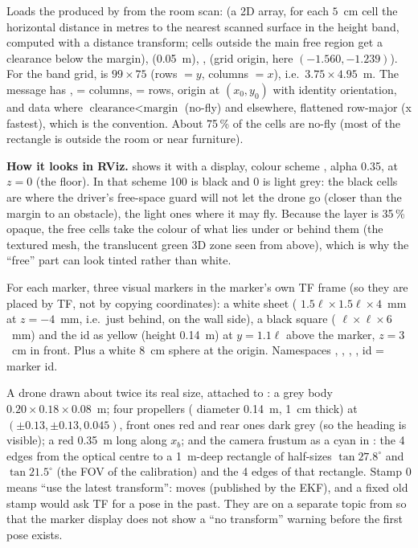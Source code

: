 Loads the  produced by  from the room scan:  (a 2D array, for
each $5$~cm cell the horizontal distance in metres to the nearest scanned surface in the height band, computed with a
distance transform; cells outside the main free region get a clearance below the margin),  (0.05~m),
,  (grid origin, here $(-1.560,-1.239)$). For the band grid,  is
$99\times75$ (rows $=y$, columns $=x$), i.e.\ $3.75\times4.95$~m. The message has
,  = columns,  = rows, origin at $(x_0,y_0)$ with identity
orientation, and data  where $\text{clearance}<\text{margin}$ (no-fly) and  elsewhere, flattened
row-major (x fastest), which is the  convention. About 75\,\% of the cells are no-fly (most of the
rectangle is outside the room or near furniture).

\textbf{How it looks in RViz.}  shows it with a  display, colour scheme , alpha
0.35, at $z=0$ (the floor). In that scheme 100 is black and 0 is light grey: the black cells are where the driver's
free-space guard will not let the drone go (closer than the margin to an obstacle), the light ones where it may fly.
Because the layer is 35\,\% opaque, the free cells take the colour of what lies under or behind them (the textured
mesh, the translucent green 3D zone seen from above), which is why the ``free'' part can look tinted rather than
white.

For each marker, three visual markers in the marker's own TF frame  (so they are placed by TF, not
by copying coordinates): a white sheet ( $1.5\ell\times1.5\ell\times4$~mm at $z=-4$~mm, i.e.\ just
behind, on the wall side), a black square ( $\ell\times\ell\times6$~mm) and the id as yellow
 (height 0.14~m) at $y=1.1\ell$ above the marker, $z=3$~cm in front. Plus a white 8~cm sphere
at the  origin. Namespaces , , , , id = marker id.

A drone drawn about twice its real size, attached to : a grey body 
$0.20\times0.18\times0.08$~m; four propellers ( diameter 0.14~m, 1~cm thick) at
$(\pm0.13,\pm0.13,0.045)$, front ones red and rear ones dark grey (so the heading is visible); a red  0.35~m
long along $x_b$; and the camera frustum as a cyan  in : the 4 edges
from the optical centre to a 1~m-deep rectangle of half-sizes $\tan 27.8^\circ$ and $\tan 21.5^\circ$ (the FOV of the
calibration) and the 4 edges of that rectangle. Stamp 0 means ``use the latest transform'':  moves
(published by the EKF), and a fixed old stamp would ask TF for a pose in the past. They are on a separate topic from
 so that the marker display does not show a ``no transform'' warning before the first
 pose exists.

